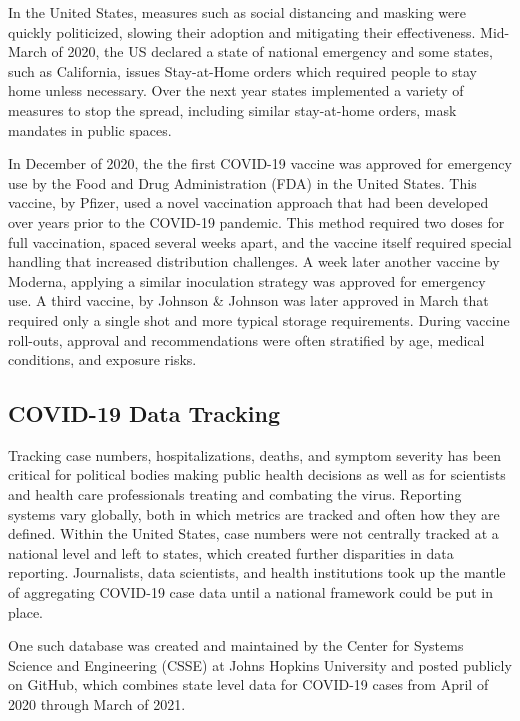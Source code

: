 \documentclass[11pt]{article}
\begin{document}
 In the United States, measures such as social distancing and masking were quickly politicized, slowing their adoption and mitigating their effectiveness. Mid-March of 2020, the US declared a state of national emergency and some states, such as California, issues Stay-at-Home orders which required people to stay home unless necessary. Over the next year states implemented a variety of measures to stop the spread, including similar stay-at-home orders, mask mandates in public spaces. 
 
 In December of 2020, the the first COVID-19 vaccine was approved for emergency use by the Food and Drug Administration (FDA) in the United States. This vaccine, by Pfizer, used a novel vaccination approach that had been developed over years prior to the COVID-19 pandemic. This method required two doses for full vaccination, spaced several weeks apart, and the vaccine itself required special handling that increased distribution challenges. A week later another vaccine by Moderna, applying a similar inoculation strategy was approved for emergency use. A third vaccine, by Johnson \& Johnson was later approved in March that required only a single shot and more typical storage requirements. 
 During vaccine roll-outs, approval and recommendations were often stratified by age, medical conditions, and exposure risks. 
	
 
 \subsection{COVID-19 Data Tracking}
	
	Tracking case numbers, hospitalizations, deaths, and symptom severity has been critical for political bodies making public health decisions as well as for scientists and health care professionals treating and combating the virus. Reporting systems vary globally, both in which metrics are tracked and often how they are defined. Within the United States, case numbers were not centrally tracked at a national level and left to states, which created further disparities in data reporting. Journalists, data scientists, and health institutions took up the mantle of aggregating COVID-19 case data until a national framework could be put in place. 
	
	One such database was created and maintained by the  Center for Systems Science and Engineering (CSSE) at Johns Hopkins University and posted publicly on GitHub, which combines state level data for COVID-19 cases from April of 2020 through March of 2021. 
	
\end{document}
